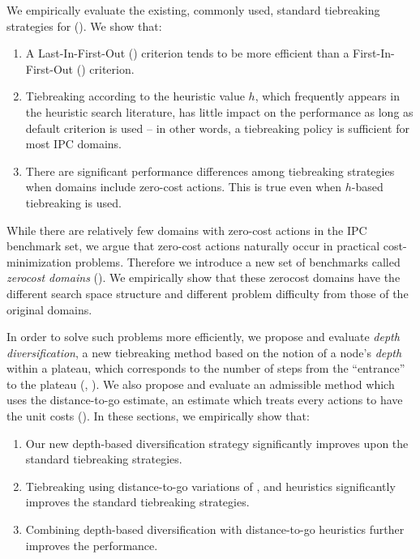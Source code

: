 We empirically evaluate the existing, commonly used, standard
tiebreaking strategies for \astar ().
We show that:

\begin{enumerate}
 \item A Last-In-First-Out (\lifo) criterion tends to be more efficient
       than a First-In-First-Out (\fifo) criterion.
 \item Tiebreaking according to the heuristic value $h$, which
       frequently appears in the heuristic search literature, has little
       impact on the performance as long as \lifo default criterion is used 
       --  in other words, a \lifo tiebreaking policy is sufficient for most IPC domains.
 \item There are significant performance differences among tiebreaking strategies
       when domains include zero-cost actions. This is true even when $h$-based tiebreaking is used.
\end{enumerate}

While there are relatively few domains with zero-cost actions in the IPC
benchmark set, we argue that zero-cost actions naturally occur in
practical cost-minimization problems. Therefore we introduce a new set of
benchmarks called \emph{zerocost domains}
().  We empirically show that these
zerocost domains have the different search space structure and different
problem difficulty from those of the original domains.

In order to solve such problems more efficiently, we propose and
evaluate \emph{depth diversification}, a new
tiebreaking method based on the notion of a node's \emph{depth} within a plateau,
which corresponds to the number of steps from the ``entrance'' to
the plateau (,
). We also propose and evaluate an
admissible method which uses the distance-to-go estimate, an estimate which treats every actions
to have the unit costs ().
In these sections, we empirically show that:
\begin{enumerate}
 \item Our new depth-based diversification strategy significantly improves upon the 
       standard tiebreaking strategies.
 \item Tiebreaking using distance-to-go variations of \lmcut, \mands and \ff heuristics
       significantly improves the standard tiebreaking strategies.
 \item Combining depth-based diversification with distance-to-go heuristics 
       further improves the performance.
\end{enumerate}


